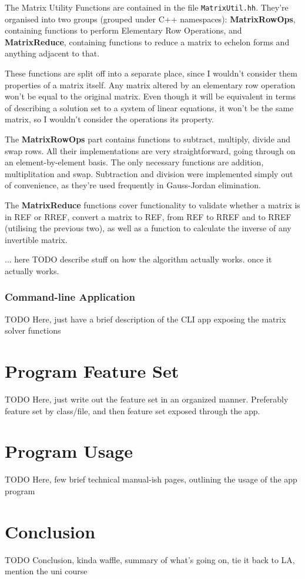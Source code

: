 \documentclass[11pt, a4paper]{article}
\begin{document}
The Matrix Utility Functions are contained in the file \texttt{MatrixUtil.hh}. They're organised into two groups (grouped under C++ namespaces): \textbf{MatrixRowOps}, containing functions to perform Elementary Row Operations, and \textbf{MatrixReduce}, containing functions to reduce a matrix to echelon forms and anything adjacent to that.

These functions are split off into a separate place, since I wouldn't consider them properties of a matrix itself. Any matrix altered by an elementary row operation won't be equal to the original matrix. Even though it will be equivalent in terms of describing a solution set to a system of linear equations, it won't be the same matrix, so I wouldn't consider the operations its property.

The \textbf{MatrixRowOps} part contains functions to subtract, multiply, divide and swap rows. All their implementations are very straightforward, going through on an element-by-element basis. The only necessary functions are addition, multiplitation and swap. Subtraction and division were implemented simply out of convenience, as they're used frequently in Gauss-Jordan elimination.

The \textbf{MatrixReduce} functions cover functionality to validate whether a matrix is in REF or RREF, convert a matrix to REF, from REF to RREF and to RREF (utilising the previous two), as well as a function to calculate the inverse of any invertible matrix.

... here TODO describe stuff on how the algorithm actually works. once it actually works.



\subsubsection{Command-line Application}

TODO Here, just have a brief description of the CLI app exposing the matrix solver functions


\section{Program Feature Set}

TODO Here, just write out the feature set in an organized manner. Preferably feature set by class/file, and then feature set exposed through the app.



\section{Program Usage}

TODO Here, few brief technical manual-ish pages, outlining the usage of the app program



\section{Conclusion}

TODO Conclusion, kinda waffle, summary of what's going on, tie it back to LA, mention the uni course
\end{document}
